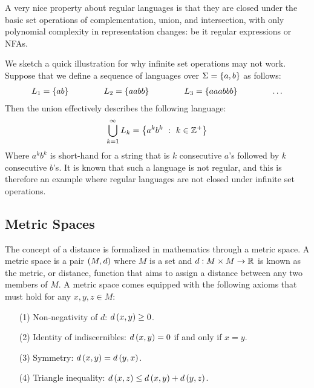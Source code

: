 A very nice property about regular languages
is that they are closed under the basic set operations of
complementation, union, and intersection,
with only polynomial complexity in representation changes:
be it regular expressions or NFAs.

We sketch a quick illustration for why infinite set operations may not work.
Suppose that we define a sequence of languages over
\(\Sigma = \left\{a, b\right\}\) as follows:
\begin{align*}
  L_1 = \left\{ab\right\}
  \qquad \qquad
  L_2 = \left\{aabb\right\}
  \qquad \qquad
  L_3 = \left\{aaabbb\right\}
  \qquad \qquad
  \ldots
\end{align*}
Then the union effectively describes the following language:
\begin{align*}
  \bigcup_{k = 1}^{\infty} L_k = \left\{a^k b^k \  : \  k \in \mathbb{Z}^{+}\right\}
\end{align*}
Where \(a^k b^k\) is short-hand for a string that is
\(k\) consecutive \(a\)'s followed by \(k\) consecutive \(b\)'s.
It is known that such a language is not regular,
and this is therefore an example where regular languages
are not closed under infinite set operations.




\subsection{Metric Spaces}

The concept of a distance is formalized in mathematics through a metric space.
A metric space is a pair \(\left(M, d\right)\) where \(M\) is a set
and \(d : M \times M \to \mathbb{R}\) is known as the metric, or distance,
function that aims to assign a distance between any two members of \(M\).
A metric space comes equipped with the following axioms
that must hold for any \(x, y, z \in M\):
\begin{enumerate}
  \item[(1)]
    Non-negativity of \(d\): \(d\left(x, y\right) \geq 0\).

  \item[(2)]
    Identity of indiscernibles:
    \(d\left(x, y\right) = 0\) if and only if \(x = y\).

  \item[(3)]
    Symmetry:
    \(d\left(x, y\right) = d\left(y, x\right)\).

  \item[(4)]
    Triangle inequality:
    \(d\left(x, z\right) \leq d\left(x, y\right) + d\left(y, z\right)\).

\end{enumerate}


